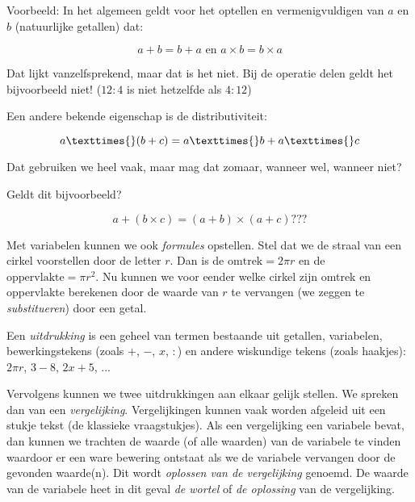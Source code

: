 \medskip{}

Voorbeeld: In het algemeen geldt voor het optellen en vermenigvuldigen
van $a$ en $b$ (natuurlijke getallen) dat:

\begin{equation*}
a + b = b + a \text{ en } a \times{} b = b \times{} a
\end{equation*}

Dat lijkt vanzelfsprekend, maar dat is het niet. Bij de operatie delen
geldt het bijvoorbeeld niet! ($12:4$ is niet hetzelfde als $4:12$)

\medskip{}

Een andere bekende eigenschap is de distributiviteit:

\begin{equation*}
a \texttimes{} (b + c) = a \texttimes{} b + a \texttimes{} c
\end{equation*}

Dat gebruiken we heel vaak, maar mag dat zomaar, wanneer wel, wanneer
niet?

Geldt dit bijvoorbeeld?

\begin{equation*}
a + (b \times{} c) = (a + b) \times{} (a + c) ???
\end{equation*}

\medskip{}


\noindent Met variabelen kunnen we ook \emph{formules} opstellen.
Stel dat we de straal van een cirkel voorstellen door de letter $r$.
Dan is de $\mathrm{omtrek}=2\pi r$ en de $\mathrm{oppervlakte}=\pi r^{2}$.
Nu kunnen we voor eender welke cirkel zijn omtrek en oppervlakte berekenen
door de waarde van $r$ te vervangen (we zeggen te \emph{substitueren})
door een getal.

\medskip{}


\noindent Een \emph{uitdrukking} is een geheel van termen bestaande
uit getallen, variabelen, bewerkingstekens (zoals $+$, $-$, $x$, $:$) en andere
wiskundige tekens (zoals haakjes): $2\pi r$, $3-8$, $2x+5$, ...

\noindent Vervolgens kunnen we twee uitdrukkingen aan elkaar gelijk
stellen. We spreken dan van een \emph{vergelijking}. Vergelijkingen
kunnen vaak worden afgeleid uit een stukje tekst (de klassieke vraagstukjes).
Als een vergelijking een variabele bevat, dan kunnen we trachten de
waarde (of alle waarden) van de variabele te vinden waardoor er een
ware bewering ontstaat als we de variabele vervangen door de gevonden
waarde(n). Dit wordt \emph{oplossen van de vergelijking} genoemd.
De waarde van de variabele heet in dit geval \emph{de wortel} of \emph{de
oplossing} van de vergelijking.

